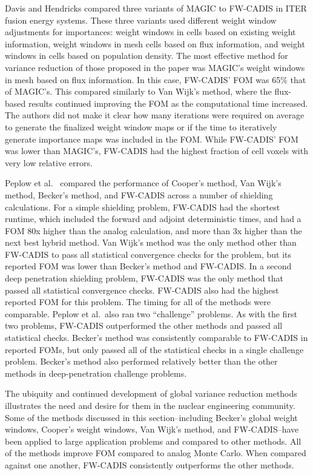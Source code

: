Davis and Hendricks compared three variants of MAGIC
to FW-CADIS in ITER fusion energy systems.
These three variants used different weight window adjustments for importances:
weight windows in cells based on existing weight information, weight windows in
mesh cells based on flux information, and weight windows in cells based on
population density.
The most effective method for variance
reduction of those proposed in the paper
was MAGIC's weight windows in mesh based on flux
information. In this case, FW-CADIS' FOM was 65\% that of MAGIC's. This compared
similarly to Van Wijk's method, where the flux-based results continued improving
the FOM as the computational time increased.
The authors did not make it clear how many iterations were required on average
to generate the finalized weight window maps or if the time to iteratively
generate importance maps was included in the FOM. While FW-CADIS' FOM was lower
than MAGIC's, FW-CADIS had the highest fraction of cell voxels with very low
relative errors.

Peplow et al.\ \cite{peplow_comparison_2012} compared the performance of
Cooper's method, Van Wijk's method, Becker's method, and FW-CADIS
across a number of shielding calculations. For a simple shielding
problem, FW-CADIS had the shortest runtime, which included the forward and
adjoint deterministic times, and had a FOM 80x higher than the analog
calculation, and more than 3x higher than the next best hybrid method. Van Wijk's method was
the only method other than FW-CADIS to pass all statistical convergence checks
for the problem, but its reported FOM was lower than Becker's method and
FW-CADIS. In a second deep penetration shielding problem, FW-CADIS was the
only method
that passed all statistical convergence checks. FW-CADIS also had the highest
reported FOM for this problem. The timing for all of the methods were
comparable. Peplow et al.\ also ran two ``challenge'' problems. As with the first
two problems, FW-CADIS outperformed the other methods and passed all statistical
checks. Becker's method was
consistently comparable to FW-CADIS in reported FOMs, but only passed all of the
statistical checks in a single challenge problem. Becker's method also performed
relatively better than the other methods in deep-penetration challenge problems.

The ubiquity and continued development of global variance reduction methods
illustrates the need and desire for them in the nuclear engineering community.
Some of the
methods discussed in this section--including Becker's global weight windows,
Cooper's weight windows, Van Wijk's method, and FW-CADIS--have
been applied to large application problems and compared to other methods.
All of the methods improve FOM
compared to analog Monte Carlo. When compared against one another, FW-CADIS
consistently outperforms the other methods.
